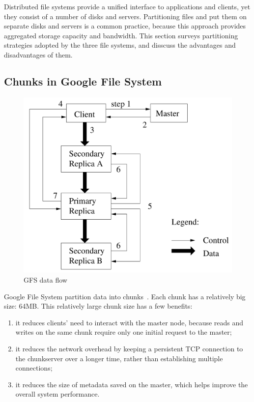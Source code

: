 Distributed file systems provide a unified interface to applications and clients,
yet they consist of a number of disks and servers.
%
Partitioning files and put them on separate disks and servers is a common practice,
because this approach provides aggregated storage capacity and bandwidth.
%
This section surveys partitioning strategies adopted by the three file systems,
and disscuss the advantages and disadvantages of them.


\subsection{Chunks in Google File System}
\label{sec:partition_gfs}
%
\begin{figure}
\centering
\includegraphics[width=0.95\columnwidth]{image/gfs_data_flow.png}
\caption{GFS data flow}
\label{fig:gfs_data_flow}
\end{figure}
%
Google File System partition data into chunks~\cite{ghemawat2003google}.
%
Each chunk has a relatively big size: 64MB.
%
This relatively large chunk size has a few benefits:
%
\begin{enumerate}
\item it reduces clients' need to interact with the master node, because reads 
	and writes on the same chunk require only one initial request to the master;
\item it reduces the network overhead by keeping a persistent TCP connection to
	the chunkserver over a longer time, rather than establishing multiple 
	connections;
\item it reduces the size of metadata saved on the master, which helps improve
	the overall system performance. 
\end{enumerate}

